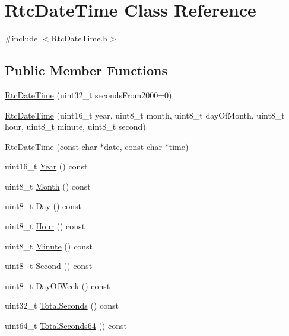\hypertarget{class_rtc_date_time}{}\section{Rtc\+Date\+Time Class Reference}
\label{class_rtc_date_time}


{\ttfamily \#include $<$Rtc\+Date\+Time.\+h$>$}

\subsection*{Public Member Functions}
\begin{DoxyCompactItemize}
\item 
\hyperlink{class_rtc_date_time_ae874891e1f436469ed4087483447c882}{Rtc\+Date\+Time} (uint32\+\_\+t seconds\+From2000=0)
\item 
\hyperlink{class_rtc_date_time_a547de741c4dc29d7097ed6c58b7c7cd3}{Rtc\+Date\+Time} (uint16\+\_\+t year, uint8\+\_\+t month, uint8\+\_\+t day\+Of\+Month, uint8\+\_\+t hour, uint8\+\_\+t minute, uint8\+\_\+t second)
\item 
\hyperlink{class_rtc_date_time_a7f00c81c8dbb3572062018357f17b0e4}{Rtc\+Date\+Time} (const char $\ast$date, const char $\ast$time)
\item 
uint16\+\_\+t \hyperlink{class_rtc_date_time_a9e09852c29989b3d5e1301138be34a59}{Year} () const 
\item 
uint8\+\_\+t \hyperlink{class_rtc_date_time_a581aafb10357287a936d3d8be95c7035}{Month} () const 
\item 
uint8\+\_\+t \hyperlink{class_rtc_date_time_a179b27f370273e72037fbb425733ae13}{Day} () const 
\item 
uint8\+\_\+t \hyperlink{class_rtc_date_time_a6d06a178cfd394f5c4701a45e0d903ef}{Hour} () const 
\item 
uint8\+\_\+t \hyperlink{class_rtc_date_time_abd88320abfda5eb9962ef1bbdcb294bc}{Minute} () const 
\item 
uint8\+\_\+t \hyperlink{class_rtc_date_time_a7323ffadc8c2539ed296c62e1dbd6767}{Second} () const 
\item 
uint8\+\_\+t \hyperlink{class_rtc_date_time_a39c9b97eab71d7da5dc1fb2df308e756}{Day\+Of\+Week} () const 
\item 
uint32\+\_\+t \hyperlink{class_rtc_date_time_a51cc5ad5b4667fbce601289004c0a477}{Total\+Seconds} () const 
\item 
uint64\+\_\+t \hyperlink{class_rtc_date_time_a513bd36f76c7f4a6715c2d74a94e868a}{Total\+Seconds64} () const 

\end{DoxyCompactItemize}
